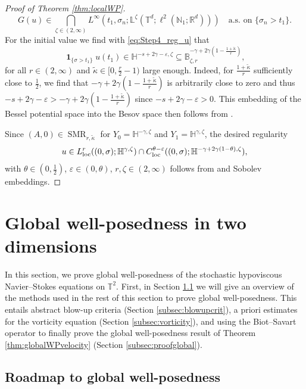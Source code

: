 \documentclass[11pt, a4paper,oneside, reqno]{amsart}
\theoremstyle{remark} %
\theoremstyle{definition} %
\numberwithin{theorem}{section}
\numberwithin{equation}{section}
\newcommand{\T}{\mathbb{T}}
\newcommand{\Ls}{\mathbb{L}}
\newcommand{\Hs}{\mathbb{H}}
\newcommand{\RR}{\mathbb{R}}
\newcommand{\NN}{\mathbb{N}}
\newcommand{\half}{\frac{1}{2}}
\newcommand{\RRd}{\RR^d}
\newcommand{\eps}{\varepsilon}
\newcommand{\gam}{\gamma}
\newcommand{\loc}{{\rm loc}}
\renewcommand{\tilde}[1]{\widetilde{#1}}
\DeclareMathOperator{\ind}{\mathbf{1}}
\DeclareMathOperator{\SMR}{SMR}
\begin{document}
\begin{proof}[Proof of Theorem \ref{thm:localWP}]
\begin{equation*}
    G(u)\in \bigcap_{\zeta\in (2,\infty)} L^\infty(t_1, \sigma_n; \Ls^{\zeta}(\T^d;\ell^2(\NN_1;\RRd)))\quad \text{a.s. on }\{\sigma_n >t_1\}.
\end{equation*}
For the initial value we find with \eqref{eq:Step4_reg_u} that
\begin{equation*}
    \ind_{\{\sigma>t_1\}} u(t_1)\in \Hs^{-s+2\gam-\eps,\zeta}\subseteq \mathbb{B}_{\zeta,r}^{-\gam + 2\gam (1-\frac{1+\tilde{\kappa}}{r})},
\end{equation*}
for all $r\in(2,\infty)$ and $\tilde{\kappa}\in [0, \frac{r}{2}-1)$ large enough. Indeed, for $\frac{1+\tilde{\kappa}}{r}$ sufficiently close to $\half$, we find that $-\gam+2\gam(1-\frac{1+\tilde{\kappa}}{r})$ is arbitrarily close to zero and thus $-s+2\gam-\eps > -\gam+2\gam(1-\frac{1+\tilde{\kappa}}{r})$ since $-s+2\gam-\eps>0$. This embedding of the Bessel potential space into the Besov space then follows from \cite[Theorems 14.7.9, 14.6.14(i) \& Proposition 14.6.8]{HNVW24}.

Since $(A,0)\in \SMR_{r,\tilde{\kappa}}$ for $Y_0=\Hs^{-\gam, \zeta}$ and $Y_1=\Hs^{\gam,\zeta}$, the desired regularity
\begin{equation*}
    u\in L^r_\loc((0,\sigma); \Hs^{\gam,\zeta})\cap C^{\theta -\eps}_\loc((0,\sigma); \Hs^{-\gam+2\gam(1-\theta),\zeta}),
\end{equation*}
with $\theta \in (0,\half)$, $\eps\in (0,\theta)$,  $r,\zeta\in (2,\infty)$ follows from \cite[Proposition 3.11]{AV25_survey} and Sobolev embeddings.
\end{proof}


\section{Global well-posedness in two dimensions} \label{section global WP}
In this section, we prove global well-posedness of the stochastic hypoviscous Navier--Stokes equations on $\T^2$. First, in Section \ref{subsec:roadmap} we will give an overview of the methods used in the rest of this section to prove  global well-posedness. This entails abstract blow-up criteria (Section \ref{subsec:blowupcrit}), a priori estimates for the vorticity equation (Section \ref{subsec:vorticity}), and using the Biot--Savart operator to finally prove the global well-posedness result of Theorem \ref{thm:globalWPvelocity} (Section \ref{subsec:proofglobal}).


\subsection{Roadmap to global well-posedness}\label{subsec:roadmap}
\end{document}
